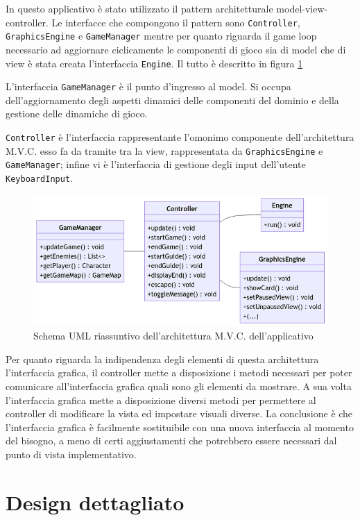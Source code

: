 \documentclass[a4paper,12pt]{report}
\begin{document}
In questo applicativo è stato utilizzato il pattern architetturale model-view-controller. Le interfacce che compongono il pattern sono \verb|Controller|, \verb|GraphicsEngine| e 
\verb|GameManager| mentre per quanto riguarda il game loop necessario ad aggiornare ciclicamente le componenti di gioco sia di model che di view è stata creata l'interfaccia \verb|Engine|. Il tutto è descritto in figura \ref{img:MVC-fig}
\par
L'interfaccia \verb|GameManager| è il punto d'ingresso al model. Si occupa dell'aggiornamento degli aspetti dinamici delle componenti del dominio e della gestione delle dinamiche di gioco.
\par
\verb|Controller| è l'interfaccia rappresentante l'omonimo componente dell'architettura M.V.C. esso fa da tramite tra la view, rappresentata da \verb|GraphicsEngine| e \verb|GameManager|; infine vi è l'interfaccia di gestione degli input dell'utente \verb|KeyboardInput|.

\begin{figure}[h]
\centering{}
\includegraphics[width=\textwidth]{img/mvc.png}
\caption{Schema UML riassuntivo dell'architettura M.V.C. dell'applicativo}
\label{img:MVC-fig}
\end{figure}

\par 
Per quanto riguarda la indipendenza degli elementi di questa architettura l'interfaccia grafica, il controller mette a disposizione i metodi necessari per poter comunicare all'interfaccia grafica quali sono gli elementi da mostrare. A sua volta l'interfaccia grafica mette a disposizione diversi metodi per permettere al controller di modificare la vista ed impostare visuali diverse. La conclusione è che l'interfaccia grafica è facilmente sostituibile con una nuova interfaccia al momento del bisogno, a meno di certi aggiustamenti che potrebbero essere necessari dal punto di vista implementativo. 

\section{Design dettagliato}
\end{document}
